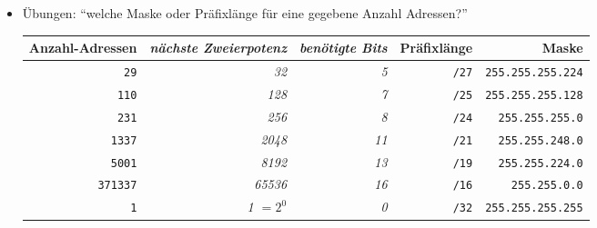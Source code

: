 \documentclass[a4paper,german]{scrartcl}
\begin{document}
\begin{itemize}
  \item \"Ubungen: ``welche Maske oder Pr\"afixl\"ange f\"ur eine gegebene Anzahl Adressen?''
      \begin{center}
        \begin{tabular}{rrrrr}
          {Anzahl-Adressen} & \emph{n\"achste Zweierpotenz} & \emph{ben\"otigte Bits} & Pr\"afixl\"ange        & Maske \\
          \hline
          \texttt{29}           &      \emph{32}                & \emph{5}                      &       \texttt{/27}     & \texttt{255.255.255.224} \\
          \texttt{110}          &      \emph{128}               & \emph{7}                      &       \texttt{/25}     & \texttt{255.255.255.128} \\
          \texttt{231}          &      \emph{256}               & \emph{8}                      &       \texttt{/24}     & \texttt{255.255.255.0} \\
          \texttt{1337}         &      \emph{2048}              & \emph{11}                     &       \texttt{/21}     & \texttt{255.255.248.0} \\
          \texttt{5001}         &      \emph{8192}              & \emph{13}                     &       \texttt{/19}     & \texttt{255.255.224.0} \\
          \texttt{371337}       &      \emph{65536}             & \emph{16}                     &       \texttt{/16}     & \texttt{255.255.0.0} \\
          \texttt{1}            &      \emph{1 $=2^0$}          & \emph{0}                      &       \texttt{/32}     & \texttt{255.255.255.255} \\
        \end{tabular}
      \end{center}
\end{itemize}

\clearpage
\end{document}
